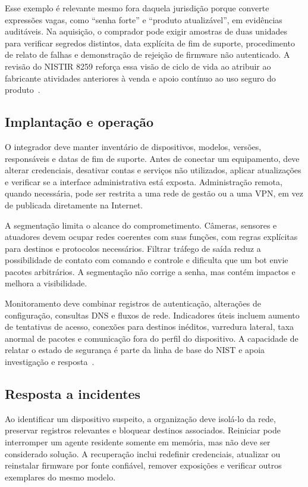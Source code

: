 \documentclass[11pt,a4paper]{article}
\begin{document}
Esse exemplo é relevante mesmo fora daquela jurisdição porque converte expressões vagas, como ``senha forte'' e ``produto atualizável'', em evidências auditáveis. Na aquisição, o comprador pode exigir amostras de duas unidades para verificar segredos distintos, data explícita de fim de suporte, procedimento de relato de falhas e demonstração de rejeição de firmware não autenticado. A revisão do NISTIR 8259 reforça essa visão de ciclo de vida ao atribuir ao fabricante atividades anteriores à venda e apoio contínuo ao uso seguro do produto~\cite{nist8259r1}.

\subsection{Implantação e operação}
O integrador deve manter inventário de dispositivos, modelos, versões, responsáveis e datas de fim de suporte. Antes de conectar um equipamento, deve alterar credenciais, desativar contas e serviços não utilizados, aplicar atualizações e verificar se a interface administrativa está exposta. Administração remota, quando necessária, pode ser restrita a uma rede de gestão ou a uma VPN, em vez de publicada diretamente na Internet.

A segmentação limita o alcance do comprometimento. Câmeras, sensores e atuadores devem ocupar redes coerentes com suas funções, com regras explícitas para destinos e protocolos necessários. Filtrar tráfego de saída reduz a possibilidade de contato com comando e controle e dificulta que um bot envie pacotes arbitrários. A segmentação não corrige a senha, mas contém impactos e melhora a visibilidade.

Monitoramento deve combinar registros de autenticação, alterações de configuração, consultas DNS e fluxos de rede. Indicadores úteis incluem aumento de tentativas de acesso, conexões para destinos inéditos, varredura lateral, taxa anormal de pacotes e comunicação fora do perfil do dispositivo. A capacidade de relatar o estado de segurança é parte da linha de base do NIST e apoia investigação e resposta~\cite{nist8259a}.

\subsection{Resposta a incidentes}
Ao identificar um dispositivo suspeito, a organização deve isolá-lo da rede, preservar registros relevantes e bloquear destinos associados. Reiniciar pode interromper um agente residente somente em memória, mas não deve ser considerado solução. A recuperação inclui redefinir credenciais, atualizar ou reinstalar firmware por fonte confiável, remover exposições e verificar outros exemplares do mesmo modelo.
\end{document}
